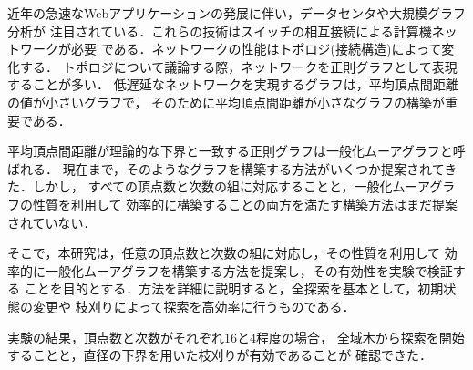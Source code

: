 
近年の急速なWebアプリケーションの発展に伴い，データセンタや大規模グラフ分析が
注目されている．これらの技術はスイッチの相互接続による計算機ネットワークが必要
である．ネットワークの性能はトポロジ(接続構造)によって変化する．
トポロジについて議論する際，ネットワークを正則グラフとして表現することが多い．
低遅延なネットワークを実現するグラフは，平均頂点間距離の値が小さいグラフで，
そのために平均頂点間距離が小さなグラフの構築が重要である．

平均頂点間距離が理論的な下界と一致する正則グラフは一般化ムーアグラフと呼ばれる．
現在まで，そのようなグラフを構築する方法がいくつか提案されてきた．しかし，
すべての頂点数と次数の組に対応することと，一般化ムーアグラフの性質を利用して
効率的に構築することの両方を満たす構築方法はまだ提案されていない．

そこで，本研究は，任意の頂点数と次数の組に対応し，その性質を利用して
効率的に一般化ムーアグラフを構築する方法を提案し，その有効性を実験で検証する
ことを目的とする．方法を詳細に説明すると，全探索を基本として，初期状態の変更や
枝刈りによって探索を高効率に行うものである．

実験の結果，頂点数と次数がそれぞれ$16$と$4$程度の場合，
全域木から探索を開始することと，直径の下界を用いた枝刈りが有効であることが
確認できた．

